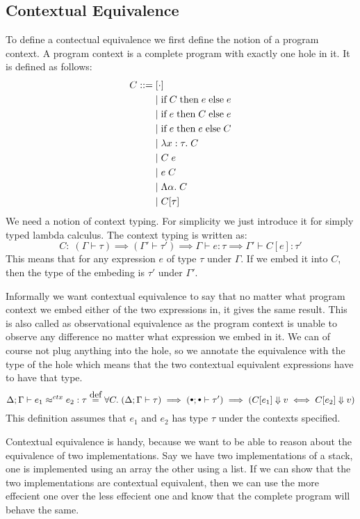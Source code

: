 \subsection*{Contextual Equivalence}
To define a contectual equivalence we first define the notion of a program context. A program context is a complete program with exactly one hole in it. It is defined as follows:
\begin{align*}
  C ::= &\;  [\cdot] \\
        &\; | \;  \text{if}\; C \; \text{then} \; e \; \text{else} \; e  \\
        &\; | \;  \text{if}\; e \; \text{then} \; C \; \text{else} \; e \\
        &\; | \;  \text{if}\; e \; \text{then} \; e \; \text{else} \; C \\
        &\; | \; \lambda x : \tau . \; C \\
        &\; | \; C \; e \\
        &\; | \; e \; C \\
        &\; | \; \Lambda \alpha . \; C \\
        &\; | \; C[\tau]
\end{align*}
We need a notion of context typing. For simplicity we just introduce it for simply typed lambda calculus. The context typing is written as:
\[
C:\; (\Gamma \vdash \tau) \implies (\Gamma' \vdash \tau') \implies \Gamma \vdash e : \tau \implies \Gamma' \vdash C[e] : \tau'
\]
This means that for any expression $e$ of type $\tau$ under $\Gamma$. If we embed it into $C$, then the type of the embeding is $\tau'$ under $\Gamma'$.

Informally we want contextual equivalence to say that no matter what program context we embed either of the two expressions in, it gives the same result. This is also called as observational equivalence as the program context is unable to observe any difference no matter what expression we embed in it. We can of course not plug anything into the hole, so we annotate the equivalence with the type of the hole which means that the two contextual equivalent expressions have to have that type.
\[
  \Delta; \Gamma \vdash \ctxeq{e_1}{e_2} : \tau \eqdef \forall C.\; (\Delta ; \Gamma \vdash \tau ) \implies (\mtenv ; \mtenv \vdash \tau') \implies (C[e_1] \Downarrow v \iff C[e_2] \Downarrow v)
\]
This definition assumes that $e_1$ and $e_2$ has type $\tau$ under the contexts specified.

Contextual equivalence is handy, because we want to be able to reason about the equivalence of two implementations. Say we have two implementations of a stack, one is implemented using an array the other using a list. If we can show that the two implementations are contextual equivalent, then we can use the more effecient one over the less effecient one and know that the complete program will behave the same.

